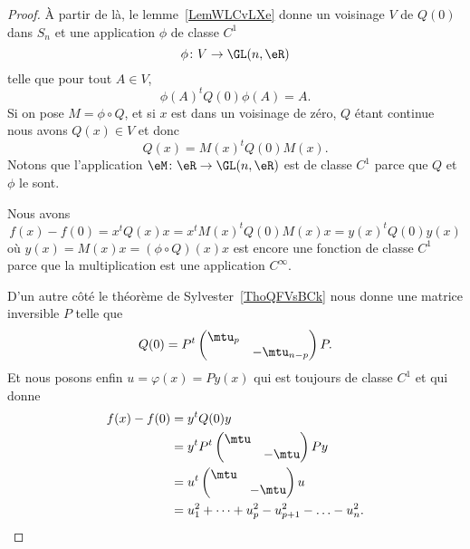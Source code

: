 \begin{proof}
	À partir de là, le lemme~\ref{LemWLCvLXe} donne un voisinage \( V\) de \( Q(0)\) dans \( S_n\) et une application \( \phi\) de classe \( C^1\)
	\begin{equation}
		\phi\colon V\to \GL(n,\eR) \\
	\end{equation}
	telle que pour tout \( A\in V\),
	\begin{equation}
		\phi(A)^tQ(0)\phi(A)=A.
	\end{equation}
	Si on pose \( M=\phi\circ Q\), et si \( x\) est dans un voisinage de zéro, \( Q\) étant continue nous avons \( Q(x)\in V\) et donc
	\begin{equation}
		Q(x)=M(x)^tQ(0)M(x).
	\end{equation}
	Notons que l'application \( \eM\colon \eR\to \GL(n,\eR)\) est de classe \( C^1\) parce que \( Q\) et \( \phi\) le sont.

	Nous avons
	\begin{equation}
		f(x)-f(0)=x^tQ(x)x=x^tM(x)^tQ(0)M(x)x=y(x)^tQ(0)y(x)
	\end{equation}
	où \( y(x)=M(x)x=(\phi\circ Q)(x)x\) est encore une fonction de classe \( C^1\) parce que la multiplication est une application \(  C^{\infty}\).

	D'un autre côté le théorème de Sylvester~\ref{ThoQFVsBCk} nous donne une matrice inversible \( P\) telle que
	\begin{equation}
		Q(0)=P^t\begin{pmatrix}
			\mtu_p &             \\
			       & -\mtu_{n-p}
		\end{pmatrix}P.
	\end{equation}
	Et nous posons enfin \( u=\varphi(x)=Py(x)\) qui est toujours de classe \( C^1\) et qui donne
	\begin{subequations}
		\begin{align}
			f(x)-f(0) & =y^tQ(0)y                                     \\
			          & =y^tP^t\begin{pmatrix}
				                   \mtu &       \\
				                        & -\mtu
			                   \end{pmatrix}Py                        \\
			          & =u^t\begin{pmatrix}
				                \mtu &       \\
				                     & -\mtu
			                \end{pmatrix}u                            \\
			          & =u_1^2+\cdots +u_p^2-u_{p+1}^2-\ldots -u_n^2.
		\end{align}
	\end{subequations}


\end{proof}
